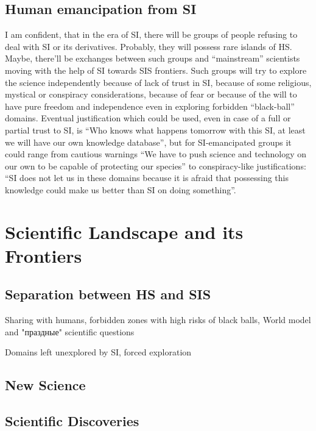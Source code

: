\documentclass[a4paper,11pt]{article}
\begin{document}
    \subsection{Human emancipation from SI}
    I am confident, that in the era of SI, there will be groups of people refusing to deal with SI or its derivatives. Probably, they will possess rare islands of HS. Maybe, there'll be exchanges between such groups and ``mainstream'' scientists moving with the help of SI towards SIS frontiers. Such groups will try to explore the science independently because of lack of trust in SI, because of some religious, mystical or conspiracy considerations, because of fear or because of the will to have pure freedom and independence even in exploring forbidden ``black-ball'' domains. Eventual justification which could be used, even in case of a full or partial trust to SI, is ``Who knows what happens tomorrow with this SI, at least we will have our own knowledge database'', but for SI-emancipated groups it could range from cautious warnings ``We have to push science and technology on our own to be capable of protecting our species'' to
    conspiracy-like justifications: ``SI does not let us in these domains because it is afraid that possessing this knowledge could make us better than SI on doing something''.
        
    \section{Scientific Landscape and its Frontiers}

        \subsection{Separation between HS and SIS}

        Sharing with humans, forbidden zones with high risks of black balls, World model and "праздные" scientific questions

        Domains left unexplored by SI, forced exploration

        \subsection{New Science}

        \subsection{Scientific Discoveries}
\end{document}
